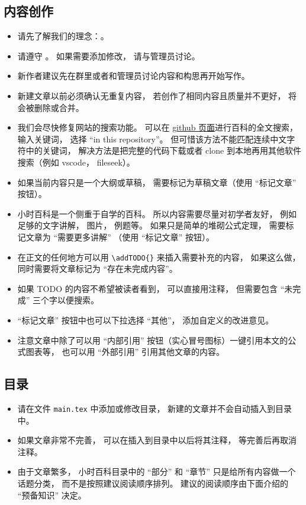 
\subsection{内容创作}
\begin{itemize}
\item 请先了解我们的理念：。
\item 请遵守 。 如果需要添加修改， 请与管理员讨论。
\item 新作者建议先在群里或者和管理员讨论内容和构思再开始写作。
\item 新建文章以前必须确认无重复内容， 若创作了相同内容且质量并不更好， 将会被删除或合并。
\item 我们会尽快修复网站的搜索功能。 可以在 \href{https://github.com/MacroUniverse/PhysWiki-log}{github 页面}进行百科的全文搜索， 输入关键词， 选择 “in this repository”。 但可惜该方法不能匹配连续中文字符中的关键词， 解决方法是把完整的代码下载或者 clone 到本地再用其他软件搜索（例如 vscode， fileseek）。
\item 如果当前内容只是一个大纲或草稿， 需要标记为草稿文章（使用 “标记文章” 按钮）。
\item 小时百科是一个侧重于自学的百科。 所以内容需要尽量对初学者友好， 例如足够的文字讲解， 图片， 例题等。 如果只是简单的堆砌公式定理， 需要标记文章为 “需要更多讲解” （使用 “标记文章” 按钮）。
\item 在正文的任何地方可以用 \verb|\addTODO{}| 来插入需要补充的内容， 如果这么做， 同时需要将文章标记为 “存在未完成内容”。
\item 如果 TODO 的内容不希望被读者看到， 可以直接用注释， 但需要包含 “未完成” 三个字以便搜索。
\item “标记文章” 按钮中也可以下拉选择 “其他”， 添加自定义的改进意见。
\item 注意文章中除了可以用 “内部引用” 按钮（实心冒号图标）一键引用本文的公式图表等， 也可以用 “外部引用” 引用其他文章的内容。
\end{itemize}

\subsection{目录}
\begin{itemize}
\item 请在文件 \verb|main.tex| 中添加或修改目录， 新建的文章并不会自动插入到目录中。
\item 如果文章非常不完善， 可以在插入到目录中以后将其注释， 等完善后再取消注释。
\item 由于文章繁多， 小时百科目录中的 “部分” 和 “章节” 只是给所有内容做一个话题分类， 而不是按照建议阅读顺序排列。 建议的阅读顺序由下面介绍的 “预备知识” 决定。
\end{itemize}

